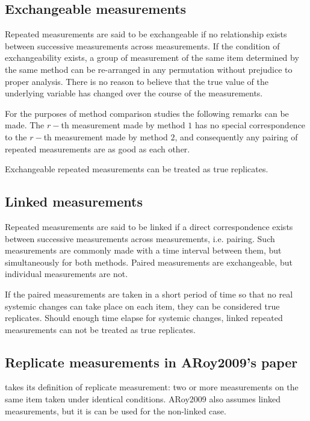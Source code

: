 \documentclass[12pt, a4paper]{report}
\theoremstyle{plain}
\theoremstyle{definition}
\theoremstyle{remark}
\begin{document}
	\subsection{Exchangeable measurements}
	Repeated measurements are said to be exchangeable if no relationship exists between successive measurements across measurements. If the condition of exchangeability exists, a group of measurement of the same item determined by the same method can be re-arranged in any permutation without prejudice to proper analysis. There is no reason to believe that the true value of the underlying variable has changed over the course of the measurements.
	
	For the purposes of method comparison studies the following remarks can be made. The $r-$th measurement made by method $1$ has no special correspondence to the $r-$th measurement made by method $2$, and consequently any pairing of repeated measurements are as good as each other.
	
	Exchangeable repeated measurements can be treated as true replicates.
	\subsection{Linked measurements}
	Repeated measurements are said to be linked if a direct correspondence exists between successive measurements across measurements, i.e. pairing. Such measurements are commonly made with a time interval between them, but simultaneously for both methods. Paired measurements are exchangeable, but individual measurements are not.
	
	If the paired measurements are taken
	in a short period of time so that no real systemic changes can take place on each item, they can be considered true replicates.
	Should enough time elapse for systemic changes, linked repeated measurements can not be treated as true replicates.
	
	\subsection{Replicate measurements in ARoy2009's paper}
	\citet{ARoy2009} takes its definition of replicate measurement: two or more measurements on the same item taken
	under identical conditions. ARoy2009 also assumes linked measurements, but it is can be used for the non-linked case.
	
	\newpage
\end{document}
